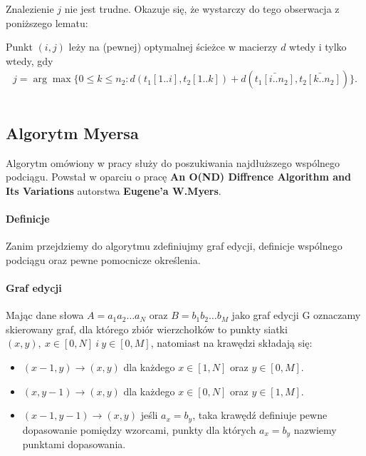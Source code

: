 Znalezienie $j$ nie jest trudne. Okazuje się, że wystarczy do tego obserwacja z poniższego lematu:
\begin{problem}{}{}
  Punkt $(i, j)$ leży na (pewnej) optymalnej ścieżce w macierzy $d$ wtedy i tylko wtedy, gdy
  \begin{align*}
      j = \arg\max \{0 \le k \le n_2: d(t_1[1..i], t_2[1..k]) + d(\bar{t_1[i..n_2]}, \bar{t_2[k..n_2]})\}.
  \end{align*}
\end{problem}

\begin{code}
\inputminted{python}{code/approximate-string-matching/hirschberg.py}
\label{alg:lcs-hirschberg}
\end{code}

\subsection{Algorytm Myersa}

Algorytm omówiony w pracy służy do poszukiwania najdłuższego wspólnego podciągu. Powstał w oparciu o pracę \textbf{An O(ND) Diffrence Algorithm and Its Variations} autorstwa \textbf{Eugene'a W.Myers}.
\paragraph{Definicje}
Zanim przejdziemy do algorytmu zdefiniujmy graf edycji, definicje wspólnego podciągu oraz pewne pomocnicze określenia.

\paragraph{Graf edycji}
 Mając dane słowa $A = a_{1}a_{2}\dots a_{N}$ oraz $B = b_{1}b_{2}\dots b_{M}$ jako graf edycji G oznaczamy skierowany graf, dla którego zbiór wierzchołków to punkty siatki $(x,y),\:x\in[0,N]\:i\:y\in[0,M]$, natomiast na krawędzi składają się:
\begin{itemize}
    \item $(x-1,y) \xrightarrow{}(x,y)$ dla każdego $x\in[1,N]$ oraz $y\in[0,M]$.
    \item $(x,y-1) \xrightarrow{}(x,y)$ dla każdego $x\in[0,N]$ oraz $y\in[1,M]$.
    \item $(x-1,y-1) \xrightarrow{}(x,y)$ jeśli $a_{x} = b_{y}$, taka krawędź definiuje pewne dopasowanie pomiędzy wzorcami, punkty dla których $a_{x} = b_{y}$ nazwiemy punktami dopasowania.
\end{itemize}

